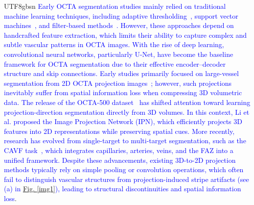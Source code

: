 \documentclass[times, review, 10pt]{elsarticle}
\begin{document}
\begin{CJK}{UTF8}{gbsn}
\textcolor{blue}{Early OCTA segmentation studies mainly relied on traditional machine learning techniques, including adaptive thresholding~\cite{ref3}, support vector machines~\cite{ref1}, and filter-based methods~\cite{ref2}. However, these approaches depend on handcrafted feature extraction, which limits their ability to capture complex and subtle vascular patterns in OCTA images. With the rise of deep learning, convolutional neural networks, particularly U-Net, have become the baseline framework for OCTA segmentation due to their effective encoder–decoder structure and skip connections. Early studies primarily focused on large-vessel segmentation from 2D OCTA projection images~\cite{ref4}; however, such projections inevitably suffer from spatial information loss when compressing 3D volumetric data. The release of the OCTA-500 dataset~\cite{ref5} has shifted attention toward learning projection-direction segmentation directly from 3D volumes. In this context, Li et al. proposed the Image Projection Network (IPN), which efficiently projects 3D features into 2D representations while preserving spatial cues. More recently, research has evolved from single-target to multi-target segmentation, such as the CAVF task~\cite{ref5}, which integrates capillaries, arteries, veins, and the FAZ into a unified framework. Despite these advancements, existing 3D-to-2D projection methods typically rely on simple pooling or convolution operations, which often fail to distinguish vascular structures from projection-induced stripe artifacts (see (a) in \hyperref[img1]{Fig. \ref*{img1}}), leading to structural discontinuities and spatial information loss}.
\par

\end{CJK}
\end{document}
